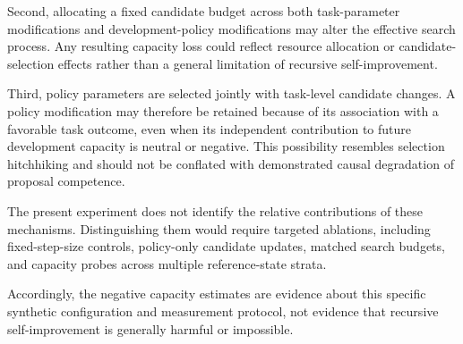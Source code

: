 \documentclass[11pt,a4paper]{article}
\begin{document}
Second, allocating a fixed candidate budget across both task-parameter modifications and development-policy modifications may alter the effective search process. Any resulting capacity loss could reflect
resource allocation or candidate-selection effects rather than a general limitation of recursive self-improvement.

Third, policy parameters are selected jointly with task-level candidate changes. A policy modification may therefore be retained because of its association with a favorable task outcome, even when its
independent contribution to future development capacity is neutral or negative. This possibility resembles selection hitchhiking and should not be conflated with demonstrated causal degradation of proposal competence.

The present experiment does not identify the relative contributions of these mechanisms. Distinguishing them would require targeted ablations, including fixed-step-size controls, policy-only
candidate updates, matched search budgets, and capacity probes across multiple reference-state strata.

Accordingly, the negative capacity estimates are evidence about this specific synthetic configuration and measurement protocol, not evidence that recursive self-improvement is generally harmful or impossible.
\end{document}
